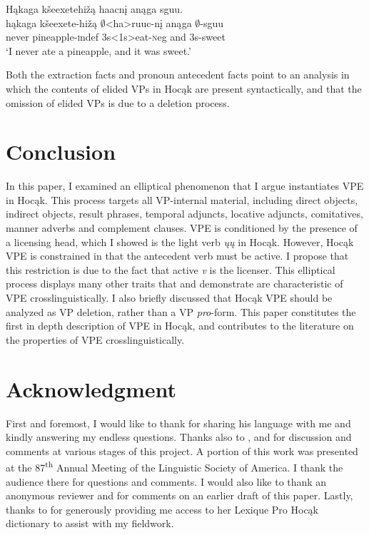 \documentclass[output=paper]{LSP/langsci}
\begin{document}
\ea\label{ex:johnson:52} 
\glll Hąkaga kšeexetehižą haacnį anąga sguu.\\
hąkaga kšeexete-hižą $\emptyset$<ha>ruuc-nį anąga $\emptyset$-sguu\\
never pineapple-{\textsc indef} {\textsc 3s<1s>}eat-{\textsc neg} and {\textsc 3s}-sweet\\
\trans `I never ate a pineapple, and it was sweet.'
\z


Both the extraction facts and pronoun antecedent facts point to an analysis in which the contents of elided VPs in Hocąk are present syntactically, and that the omission of elided VPs is due to a deletion process.

\section{Conclusion}\label{sec:johnson:5}

In this paper, I examined an elliptical phenomenon that I argue instantiates VPE in Hocąk. This process targets all VP-internal material, including direct objects, indirect objects, result phrases, temporal adjuncts, locative adjuncts, comitatives, manner adverbs and complement clauses. VPE is conditioned by the presence of a licensing head, which I showed is the light verb \emph{ųų} in Hocąk. However, Hocąk VPE is constrained in that the antecedent verb must be active. I propose that this restriction is due to the fact that active \emph{v} is the licenser. This elliptical process displays many other traits that \citet{Goldberg2005} and \citet{Fortin2007} demonstrate are characteristic of VPE crosslinguistically. I also briefly discussed that Hocąk VPE should be analyzed as VP deletion, rather than a VP \emph{pro}-form. This paper constitutes the first in depth description of VPE in Hocąk, and contributes to the literature on the properties of VPE crosslinguistically. 

\section*{Acknowledgment}

First and foremost, I would like to thank  for sharing his language with me and kindly answering my endless questions. Thanks also to ,  and  for discussion and comments at various stages of this project. A portion of this work was presented at the 87\textsuperscript{th} Annual Meeting of the Linguistic Society of America. I thank the audience there for questions and comments. I would also like to thank an anonymous reviewer and  for comments on an earlier draft of this paper. Lastly, thanks to  for generously providing me access to her Lexique Pro Hocąk dictionary to assist with my fieldwork.
\end{document}
